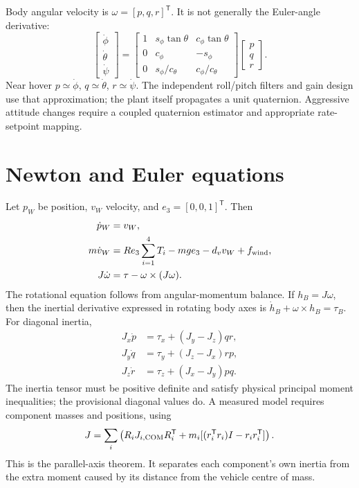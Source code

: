 Body angular velocity is $\omega=[p,q,r]^{\mathsf T}$. It is not generally the
Euler-angle derivative:
\begin{equation}
\begin{bmatrix}\dot\phi\\\dot\theta\\\dot\psi\end{bmatrix}
=\begin{bmatrix}1&s_\phi\tan\theta&c_\phi\tan\theta\\
0&c_\phi&-s_\phi\\0&s_\phi/c_\theta&c_\phi/c_\theta\end{bmatrix}
\begin{bmatrix}p\\q\\r\end{bmatrix}.
\end{equation}
Near hover $p\simeq\dot\phi$, $q\simeq\dot\theta$, $r\simeq\dot\psi$.
The independent roll/pitch filters and gain design use that approximation;
the plant itself propagates a unit quaternion. Aggressive attitude changes
require a coupled quaternion estimator and appropriate rate-setpoint mapping.

\section{Newton and Euler equations}
Let $p_W$ be position, $v_W$ velocity, and $e_3=[0,0,1]^{\mathsf T}$. Then
\begin{align}
\dot p_W&=v_W,\\
m\dot v_W&=R e_3\sum_{i=1}^4T_i-mge_3-d_vv_W+f_{\rm wind},\\
J\dot\omega&=\tau-\omega\times(J\omega).
\end{align}
The rotational equation follows from angular-momentum balance. If $h_B=J\omega$,
then the inertial derivative expressed in rotating body axes is
$\dot h_B+\omega\times h_B=\tau_B$. For diagonal inertia,
\begin{align}
J_x\dot p&=\tau_x+(J_y-J_z)qr,\\
J_y\dot q&=\tau_y+(J_z-J_x)rp,\\
J_z\dot r&=\tau_z+(J_x-J_y)pq.
\end{align}
The inertia tensor must be positive definite and satisfy physical principal
moment inequalities; the provisional diagonal values do. A measured model
requires component masses and positions, using
\begin{equation}
J=\sum_i\left(R_iJ_{i,\rm COM}R_i^{\mathsf T}
 +m_i[(r_i^{\mathsf T}r_i)I-r_ir_i^{\mathsf T}]\right).
\end{equation}
This is the parallel-axis theorem. It separates each component's own inertia
from the extra moment caused by its distance from the vehicle centre of mass.

